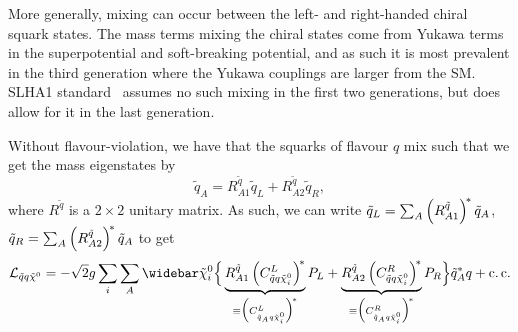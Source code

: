 \documentclass[../main.tex]{subfiles}
\begin{document}
More generally, mixing can occur between the left- and right-handed chiral squark states.
The mass terms mixing the chiral states come from Yukawa terms in the superpotential and soft-breaking potential, and as such it is most prevalent in the third generation where the Yukawa couplings are larger from the SM.
SLHA1 standard~\cite{SLHA1} assumes no such mixing in the first two generations, but does allow for it in the last generation.

Without flavour-violation, we have that the squarks of flavour \(q\) mix such that we get the mass eigenstates by
\begin{equation}
  \tilde{q}_{A} = R_{A1}^{\tilde{q}} \tilde{q}_{L} + R_{A2}^{\tilde{q}} \tilde{q}_{R},
\end{equation}
where \(R^{\tilde{q}}\) is a \(2\times 2\) unitary matrix.
As such, we can write \(\tilde{q}_{L} = \sum_A \left(R^{\tilde{q}}_{A1}\right)^{\!\ast} \tilde{q}_{A}\), \(\tilde{q}_{R} = \sum_A \left(R^{\tilde{q}}_{A2}\right)^{\!\ast} \tilde{q}_{A}\) to get
\begin{equation}
  \label{susy:eq:sqqneu-interaction-L}
  \L_{\tilde{q} q \tilde{\chi}^0} = -\sqrt{2} g \sum_{i} \sum_A \barnino[i] \Big\{ \underbrace{R^{\tilde{q}}_{A1} \pclosed{C_{\tilde{q} q \tilde{\chi}_i^0}^{L}}^{\!\ast}}_{\equiv \Big(C_{\tilde{q}_A q \tilde{\chi}_i^0}^{L}\Big)^{\!\ast}} P_L + \underbrace{R^{\tilde{q}}_{A2} \pclosed{C_{\tilde{q} q \tilde{\chi}_i^0}^{R}}^{\!\ast}}_{\equiv \Big(C_{\tilde{q}_A q \tilde{\chi}_i^0}^{R}\Big)^{\!\ast}} P_R \Big\} \tilde{q}_{A}^\ast q + \cc
\end{equation}
\end{document}
